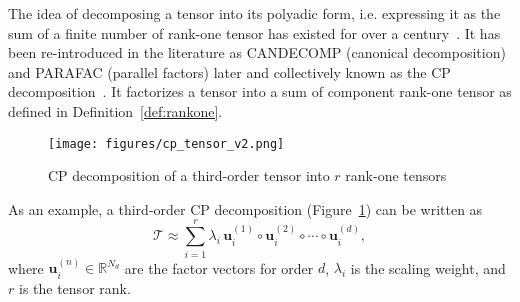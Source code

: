 The idea of decomposing a tensor into its polyadic form, i.e. expressing it as the sum of a finite number of rank-one tensor has existed for over a century~\cite{hitchcock1927expression}. It has been re-introduced in the literature as CANDECOMP (canonical decomposition) and PARAFAC (parallel factors) later and collectively known as the CP decomposition~\cite{harshman1970foundations, harshman1972parafac2}. It factorizes a tensor into a sum of component rank-one tensor as defined in Definition~\ref{def:rankone}. 
\begin{figure}[!htbp]
    \centering
    \texttt{[image: figures/cp\_tensor\_v2.png]}
    \caption{CP decomposition of a third-order tensor into $r$ rank-one tensors}
    \label{fig:cp}
\end{figure}
    
    As an example, a third-order CP decomposition (Figure~\ref{fig:cp}) can be written as 
    \begin{equation}\label{eq:cp}
        \mathcal{T} \approx \sum_{i=1}^r \lambda_i \, \mathbf{u}_i^{(1)} \circ \mathbf{u}_i^{(2)} \circ \cdots \circ \mathbf{u}_i^{(d)},
    \end{equation}
    where $\mathbf{u}_i^{(n)} \in \mathbb{R}^{N_d}$ are the factor vectors for order $d$, $\lambda_i$ is the scaling weight, and  $r$ is the tensor rank. 

